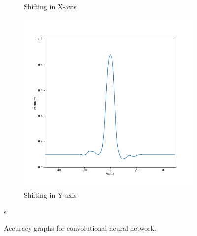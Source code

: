 \begin{figure}[htb!]
\begin{subfigure}[b]{0.3\textwidth}
        \caption{Shifting in X-axis}
        \label{fig:Rotate-misclass0}
    \end{subfigure}
    \begin{subfigure}[b]{0.3\textwidth}
        \centering
        \includegraphics[width=\textwidth]{chapters/results/CNN/ShiftY/acc.png}
        \caption{Shifting in Y-axis}
        \label{fig:Rotate-misclass0}
    \end{subfigure}s
    \caption{Accuracy graphs for convolutional neural network.}
    \label{fig:Rotate-misclassifications}
\end{figure}

\clearpage



